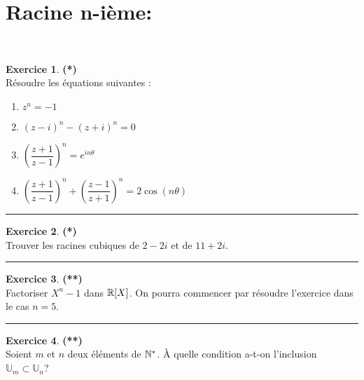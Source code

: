 \documentclass[a4paper,11pt]{article}
\theoremstyle{definition}
\newtheorem{exo}{Exercice} %
\begin{document}
\section*{Racine n-ième:}\hfill\\%
\begin{minipage}{1\linewidth}
	\begin{minipage}[c]{0.48\linewidth}
		\raggedright
		
		

				
	
		
		
		

		
		\begin{exo}\textbf{(*)}\quad\\[0.2cm]
			
		Résoudre les équations suivantes :
		\begin{enumerate}
			\item $z^n = -1$
			\item $(z-i)^n-(z+i)^n=0$
			\item $\left( \dfrac{z+1}{z-1} \right)^n = e^{in \theta}$
			\item $\left( \dfrac{z+1}{z-1} \right)^n + \left( \dfrac{z-1}{z+1} \right)^n = 2 \cos(n \theta)$
		\end{enumerate}
			
			\centering
			\rule{1\linewidth}{0.6pt}
		\end{exo}
		
				\begin{exo}\textbf{(*)}\quad\\[0.2cm]
			Trouver les racines cubiques de 
			$2-2i$ et de $11+2i$.
			
			
			\centering
			\rule{1\linewidth}{0.6pt}
		\end{exo}
	
				\begin{exo}\textbf{(**)}\quad\\[0.2cm]
			Factoriser $X^n-1$ dans $\mathbb{R}[X]$. On pourra commencer par résoudre
			l'exercice dans le cas $n=5$.
			
			\centering
			\rule{1\linewidth}{0.6pt}
		\end{exo}
		
			\begin{exo}\textbf{(**)}\quad\\[0.2cm]
			Soient $m$ et $n$ deux éléments de $\mathbb{N}^*$. À quelle condition
			a-t-on l'inclusion $\mathbb{U}_m \subset \mathbb{U}_n $?
			

\end{exo}
\end{minipage}
\end{minipage}
\end{document}
